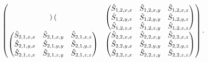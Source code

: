 \begin{equation}
\begin{gathered}
\begin{pmatrix}
\begin{pmatrix}
        \end{pmatrix}
        &
        \begin{pmatrix}
            \hat{S}_{1, 2, x, x} & \hat{S}_{1, 2, x, y} & \hat{S}_{1, 2, x, z} \\
            \hat{S}_{1, 2, y, x} & \hat{S}_{1, 2, y, y} & \hat{S}_{1, 2, y, z} \\
            \hat{S}_{1, 2, z, x} & \hat{S}_{1, 2, z, y} & \hat{S}_{1, 2, z, z} \\
        \end{pmatrix}
        \\
        \begin{pmatrix}
            \hat{S}_{2, 1, x, x} & \hat{S}_{2, 1, x, y} & \hat{S}_{2, 1, x, z} \\
            \hat{S}_{2, 1, y, x} & \hat{S}_{2, 1, y, y} & \hat{S}_{2, 1, y, z} \\
            \hat{S}_{2, 1, z, x} & \hat{S}_{2, 1, z, y} & \hat{S}_{2, 1, z, z} \\
        \end{pmatrix}
        &
        \begin{pmatrix}
            \hat{S}_{2, 2, x, x} & \hat{S}_{2, 2, x, y} & \hat{S}_{2, 2, x, z} \\
            \hat{S}_{2, 2, y, x} & \hat{S}_{2, 2, y, y} & \hat{S}_{2, 2, y, z} \\
            \hat{S}_{2, 2, z, x} & \hat{S}_{2, 2, z, y} & \hat{S}_{2, 2, z, z} \\
        \end{pmatrix}
    \end{pmatrix}
    \text{.}
    \end{gathered}
    \label{eq:matrix_of_matrices}
\end{equation}

